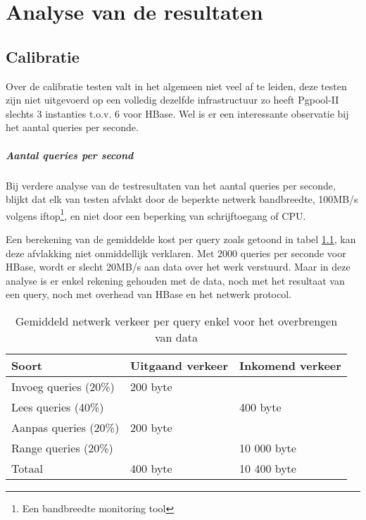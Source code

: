 \chapter{Analyse van de resultaten}

\section{Calibratie}
Over de calibratie testen valt in het algemeen niet veel af te leiden, deze testen zijn niet uitgevoerd op een volledig dezelfde infrastructuur zo heeft Pgpool-II slechts 3 instanties t.o.v. 6 voor HBase. Wel is er een interessante observatie bij het aantal queries per seconde.  

\paragraph{Aantal queries per second} Bij verdere analyse van de testresultaten van het aantal queries per seconde, blijkt dat elk van testen afvlakt door de beperkte netwerk bandbreedte, 100MB/s volgens iftop\footnote{Een bandbreedte monitoring tool}, en niet door een beperking van schrijftoegang of CPU. 

Een berekening van de gemiddelde kost per query zoals getoond in tabel \ref{table:calibratie-analyse-netwerk}, kan deze afvlakking niet onmiddellijk verklaren. Met 2000 queries per seconde voor HBase, wordt er slecht 20MB/s aan data over het werk verstuurd. Maar in deze analyse is er enkel rekening gehouden met de data, noch met het resultaat van een query, noch met overhead van HBase en het netwerk protocol. 


\begin{table}[h!]
\centering
\begin{tabular}{l|l l}
	\textbf{Soort}  & \textbf{Uitgaand verkeer} & \textbf{Inkomend verkeer} \\ \hline
	Invoeg queries (20\%) & 200 byte  & \\
	Lees queries (40\%) & & 400 byte\\
	Aanpas queries (20\%) & 200 byte & \\
	Range queries (20\%) & & 10 000 byte\\ \hline
	Totaal & 400 byte & 10 400 byte \\
\end{tabular}
\caption{Gemiddeld netwerk verkeer per query enkel voor het overbrengen van data}\label{table:calibratie-analyse-netwerk}
\end{table}

